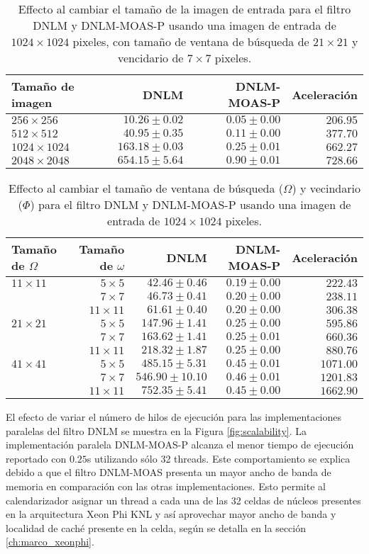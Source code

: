 \begin{table}[H]
\protect\caption{Effecto al cambiar el tama\~no de la imagen de entrada para el filtro DNLM y DNLM-MOAS-P usando una imagen de entrada de  $1024 \times 1024$ pixeles, con tama\~no de ventana de b\'usqueda de $21 \times 21$ y vencidario de $7 \times 7$ pixeles. \label{tabla:scala1}}
\centering
\begin{tabular}{lrrr}
Tama\~no de imagen & DNLM & DNLM-MOAS-P & Aceleraci\'on \tabularnewline
\hline
$256 \times 256$ & $10.26\pm0.02$ & $0.05\pm0.00$ & $206.95$ \tabularnewline
$512 \times 512$ & $40.95\pm0.35$ & $0.11\pm0.00$ & $377.70$ \tabularnewline
$1024 \times 1024$ & $163.18\pm0.03$ & $0.25\pm0.01$ & $662.27$ \tabularnewline
$2048 \times 2048$ & $654.15\pm5.64$ & $0.90\pm0.01$ & $728.66$ \tabularnewline
\end{tabular}
\end{table}


\begin{table}[H]
\protect\caption{Effecto al cambiar el tama\~no de ventana de b\'usqueda ($\Omega$) y vecindario ($\Phi$) para el filtro DNLM y DNLM-MOAS-P usando una imagen de entrada de  $1024 \times 1024$ pixeles. \label{tabla:scala2}}
\centering
\begin{tabular}{lrrrr}
Tama\~no de $\Omega$  & Tama\~no de $\omega$ & DNLM & DNLM-MOAS-P & Aceleraci\'on \tabularnewline
\hline
$11 \times 11$ & $5 \times 5$ & $42.46\pm0.46$ & $0.19\pm0.00$ & $222.43$ \tabularnewline
 & $7 \times 7$ & $46.73\pm0.41$ & $0.20\pm0.00$ & $238.11$ \tabularnewline
 & $11 \times 11$ & $61.61\pm0.40$ & $0.20\pm0.00$ & $306.38$ \tabularnewline
$21 \times 21$ & $5 \times 5$ & $147.96\pm1.41$ & $0.25\pm0.00$ & $595.86$ \tabularnewline
 & $7 \times 7$ & $163.62\pm1.41$ & $0.25\pm0.01$ & $660.36$ \tabularnewline
 & $11 \times 11$ & $218.32\pm1.87$ & $0.25\pm0.00$ & $880.76$ \tabularnewline
 $41 \times 41$ & $5 \times 5$ & $485.15\pm5.31$ & $0.45\pm0.01$ & $1071.00$ \tabularnewline
 & $7 \times 7$ & $546.90\pm10.10$ & $0.46\pm0.01$ & $1201.83$ \tabularnewline
 & $11 \times 11$ & $752.35\pm5.41$ & $0.45\pm0.00$ & $1662.90$ \tabularnewline
\end{tabular}
\end{table}




El efecto de variar el n\'umero de hilos de ejecuci\'on para las implementaciones paralelas del filtro DNLM se muestra en la Figura \ref{fig:scalability}. La implementaci\'on paralela DNLM-MOAS-P alcanza el menor tiempo de ejecuci\'on reportado con $0.25$s utilizando s\'olo 32 threads. Este comportamiento se explica debido a que el filtro DNLM-MOAS presenta un mayor ancho de banda de memoria en comparaci\'on con las otras implementaciones. Esto permite al calendarizador asignar un thread a cada una de las 32 celdas de n\'ucleos presentes en la arquitectura Xeon Phi KNL y as\'i aprovechar mayor ancho de banda y localidad de cach\'e presente en la celda, seg\'un se detalla en la secci\'on \ref{ch:marco_xeonphi}. 





